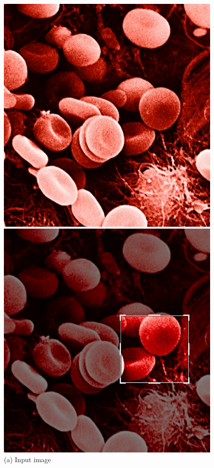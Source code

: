 \documentclass[12pt,a4paper]{report}
\begin{document}
\begin{figure}[H]

\centering
\includegraphics[scale=0.19]{pics/rbc_input.jpg}
\caption*{(a) Input image}
\endminipage\hspace*{0.5cm}
\centering
\includegraphics[scale=0.15]{pics/rbc_bi.jpg}

\end{figure}
\end{document}
